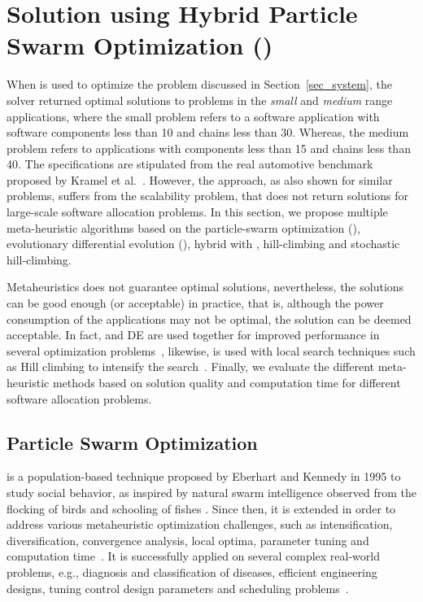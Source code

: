 \section{Solution using Hybrid Particle Swarm Optimization (\pso)}\label{sec_solution}
When \ilp{} is used to optimize the problem discussed in Section~\ref{sec_system}, the \cplex{} solver returned optimal solutions to problems in the \textit{small} and \textit{medium} range applications, where the small problem refers to a software application with software components less than 10 and chains less than 30. Whereas, the medium problem refers to applications with components less than 15 and chains less than 40. The specifications are stipulated from the real automotive benchmark proposed by Kramel et al.~\cite{Kramer2015RealFree}. However, the \ilp{} approach, as also shown for similar problems, suffers from the scalability problem, that does not return solutions for large-scale software allocation problems. In this section, we propose multiple meta-heuristic algorithms based on the particle-swarm optimization (\pso), evolutionary differential evolution (\de), hybrid \pso{} with \de{},  hill-climbing and stochastic hill-climbing. 

Metaheuristics does not guarantee optimal solutions, nevertheless, the solutions can be good enough (or acceptable) in practice, that is, although the power consumption of the applications may not be optimal, the solution can be deemed acceptable. In fact, \pso{} and DE are used together for improved performance in several optimization problems~\cite{Sengupta2018ParticlePerspectives,Mirjalili2019ParticleOptimisation}, likewise, \pso{} is used with local search techniques such as Hill climbing to intensify the search~\cite{yin2007task}. Finally, we evaluate the different meta-heuristic methods based on solution quality and computation time for different software allocation problems.

\subsection{Particle Swarm Optimization}
\pso{} is a population-based technique proposed by Eberhart and Kennedy in 1995 to study social behavior, as inspired by natural swarm intelligence observed from the flocking of birds and schooling of fishes \cite{Kennedy1995ParticleOptimization}. Since then, it is extended in order to address various metaheuristic optimization challenges, such as intensification, diversification, convergence analysis, local optima, parameter tuning and computation time~\cite{Sengupta2018ParticlePerspectives}. It is successfully applied on several complex real-world problems, e.g., diagnosis and classification of diseases, efficient engineering designs, tuning control design parameters and scheduling problems~\cite{Poli2008AnApplications}. 

